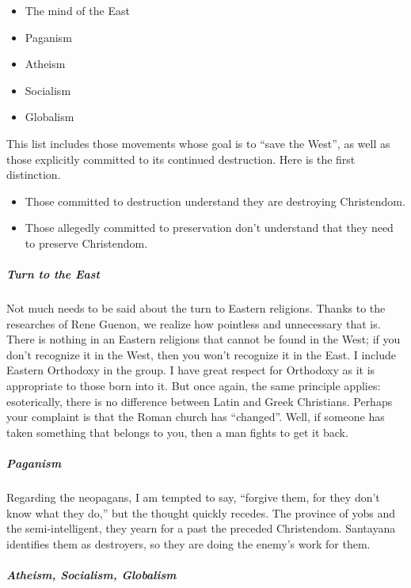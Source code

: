 \begin{itemize}


\item The mind of the East

\item Paganism

\item Atheism

\item Socialism

\item Globalism
\end{itemize}


This list includes those movements whose goal is to ``save the West'', as well as those explicitly committed to its continued destruction. Here is the first distinction.

\begin{itemize}


\item Those committed to destruction understand they are destroying Christendom.

\item Those allegedly committed to preservation don't understand that they need to preserve Christendom.
\end{itemize}


\subparagraph{Turn to the East}


Not much needs to be said about the turn to Eastern religions. Thanks to the researches of Rene Guenon, we realize how pointless and unnecessary that is. There is nothing in an Eastern religions that cannot be found in the West; if you don't recognize it in the West, then you won't recognize it in the East. I include Eastern Orthodoxy in the group. I have great respect for Orthodoxy as it is appropriate to those born into it. But once again, the same principle applies: esoterically, there is no difference between Latin and Greek Christians. Perhaps your complaint is that the Roman church has ``changed''. Well, if someone has taken something that belongs to you, then a man fights to get it back.

\subparagraph{Paganism}


Regarding the neopagans, I am tempted to say, ``forgive them, for they don't know what they do,'' but the thought quickly recedes. The province of yobs and the semi-intelligent, they yearn for a past the preceded Christendom. Santayana identifies them as destroyers, so they are doing the enemy's work for them.

\subparagraph{Atheism, Socialism, Globalism}


